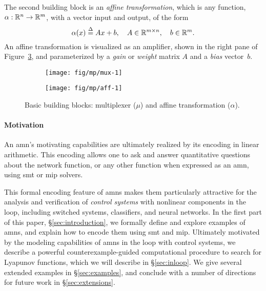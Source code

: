 \documentclass[10pt]{article}
\theoremstyle{remark}
\theoremstyle{definition}
\theoremstyle{plain}
\begin{document}
The second building block is an \emph{affine transformation}, which is any function,
$\alpha : \mathbb{R}^n \to \mathbb{R}^m$, with a vector input and output, of the form
\begin{equation}
	\label{eq:aff}
	\alpha(x) \mathrel{\stackrel{\Delta}{=}} Ax + b, 
	\quad A \in \mathbb{R}^{m\times n},
	\quad b\in\mathbb{R}^m.
\end{equation}
An affine transformation is visualized as an amplifier, shown in the right
pane of Figure~\ref{fig:basicblocks}, and parameterized by a \emph{gain} or
\emph{weight} matrix $A$ and a \emph{bias} vector~$b$.

\begin{figure}[hbtp]
	\centering
    \begin{subfigure}{0.4\linewidth}
		\centering
        \texttt{[image: fig/mp/mux-1]}
		\label{fig:mux1}
    \end{subfigure}
    \quad
    \begin{subfigure}{0.4\linewidth}
		\centering
        \texttt{[image: fig/mp/aff-1]}
        \label{fig:aff1}
    \end{subfigure}
	\caption{Basic building blocks: multiplexer ($\mu$) and affine
	transformation ($\alpha$).}
    \label{fig:basicblocks}
	\vspace{-5ex}
\end{figure}


\paragraph{Motivation}
An \acl{amn}'s motivating capabilities are ultimately realized by its encoding in linear
arithmetic.  This encoding allows one to ask and answer quantitative questions
about the network function, or any other function when expressed as an
\acs{amn}, using \ac{smt} or \ac{mip} solvers. 

This formal encoding feature of \acsp{amn} makes them particularly attractive
for the analysis and verification of \emph{control systems} with nonlinear
components in the loop, including switched systems, classifiers, 
and neural networks.
In the first part of this paper, \S\ref{sec:introduction}, we formally define
and explore examples of \acsp{amn}, and explain how to encode them using
\acs{smt} and \ac{mip}. 
Ultimately motivated by the modeling capabilities of \acsp{amn} in the loop
with control systems, we describe a powerful counterexample-guided
computational procedure to search for Lyapunov functions, which we will
describe in \S\ref{sec:inloop}. We give several extended examples in
\S\ref{sec:examples}, and conclude with a number of directions for future work
in \S\ref{sec:extensions}.
\end{document}
